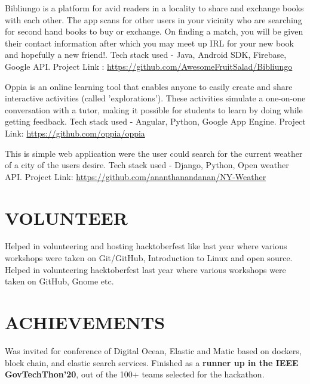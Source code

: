 \documentclass[11pt,a4paper,sans]{moderncv}        %
\begin{document}
{Bibliungo is a platform for avid readers in a locality to share and exchange books with each other. The app scans for other users in your vicinity who are searching for second hand books to buy or exchange. On finding a match, you will be given their contact information after which you may meet up IRL for your new book and hopefully a new friend!. Tech stack used - Java, Android SDK, Firebase, Google API.
Project Link : {\newline}
\url{https://github.com/AwesomeFruitSalad/Bibliungo}}

{Oppia is an online learning tool that enables anyone to easily create and share interactive activities (called 'explorations'). These activities simulate a one-on-one conversation with a tutor, making it possible for students to learn by doing while getting feedback. Tech stack used - Angular, Python, Google App Engine. Project Link: {\newline}
\url{https://github.com/oppia/oppia}}{}

{This is simple web application were the user could search for the current weather of a city of the users desire. Tech stack used - Django, Python, Open weather API. Project Link: {\newline}
\url{https://github.com/ananthanandanan/NY-Weather}}{}



\section{VOLUNTEER}
{Helped in volunteering and hosting hacktoberfest like last year where various workshops were taken on Git/GitHub, Introduction to Linux and open source.}
{Helped in volunteering  hacktoberfest last year where various workshops were taken on GitHub, Gnome etc. }


\section{ACHIEVEMENTS}
{Was invited for conference of Digital Ocean, Elastic and Matic based on dockers, block chain, and elastic search services. }
{Finished as a \textbf{runner up in the IEEE GovTechThon'20}, out of the 100+ teams selected for the hackathon. }
\end{document}
